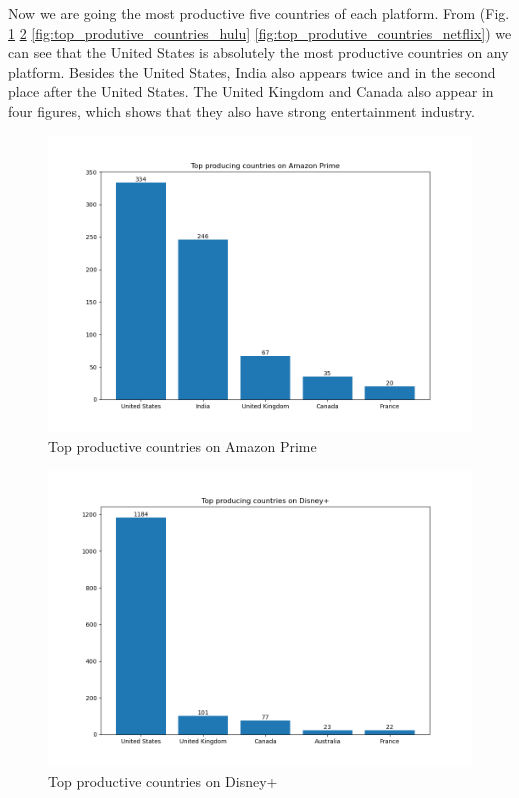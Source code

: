 \documentclass{article}
\begin{document}
Now we are going the most productive five countries of each platform. From (Fig.
\ref{fig:top_produtive_countries_amazon_prime}
\ref{fig:top_produtive_countries_disney_plus}
\ref{fig:top_produtive_countries_hulu}
\ref{fig:top_produtive_countries_netflix}) 
we can see that the United States is absolutely the most productive countries on 
any platform. Besides the United States, India also appears twice and in the 
second place after the United States. The United Kingdom and Canada also appear in 
four figures, which shows that they also have strong entertainment industry.
\begin{figure}[!htb]
	\centering
	\includegraphics[scale=0.5]{../producing_countries/Amazon Prime_producing_countries.png}
	\caption{Top productive countries on Amazon Prime}
	\label{fig:top_produtive_countries_amazon_prime}
\end{figure}
\begin{figure}[!htb]
	\centering
	\includegraphics[scale=0.5]{../producing_countries/Disney+_producing_countries.png}
	\caption{Top productive countries on Disney+}
	\label{fig:top_produtive_countries_disney_plus}
\end{figure}
\end{document}
